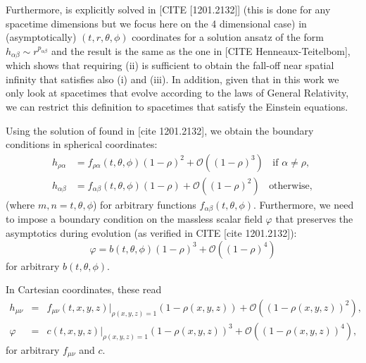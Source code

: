 \documentclass[12pt]{iopart} %
\begin{document}
Furthermore,  is explicitly solved in [CITE [1201.2132]] (this is done for any spacetime dimensions but we focus here on the 4 dimensional case) in (asymptotically) $(t,r,\theta,\phi)$ coordinates for a solution ansatz of the form $h_{\alpha\beta}\sim r^{p_{\alpha\beta}}$ and the result is the same as the one in [CITE Henneaux-Teitelbom], which shows that requiring (ii) is sufficient to obtain the fall-off near spatial infinity that satisfies also (i) and (iii).
In addition, given that in this work we only look at spacetimes that evolve according to the laws of General Relativity, we can restrict this definition to spacetimes that satisfy the Einstein equations.

Using the solution of  found in [cite 1201.2132], we obtain the boundary conditions in spherical coordinates:
\begin{eqnarray}
\label{eq:sphbounconh}
h_{\rho\alpha}&=f_{\rho\alpha}(t,\theta,\phi)(1-\rho)^2+\mathcal{O}((1-\rho)^3) \;\; \textrm{ if $\alpha\neq\rho$}, \\ \nonumber
h_{\alpha\beta}&=f_{\alpha\beta}(t,\theta,\phi)(1-\rho)+\mathcal{O}((1-\rho)^{2}) \;\; \textrm{ otherwise},
\end{eqnarray}
(where $m,n=t,\theta,\phi$) for arbitrary functions $f_{\alpha\beta}(t,\theta,\phi)$. Furthermore, we need to impose a boundary condition on the massless scalar field $\varphi$ that preserves the asymptotics  during evolution (as verified in CITE [cite 1201.2132]):
\begin{equation}\label{eq:sphbounconphi}
\varphi=b(t,\theta,\phi)(1-\rho)^3+\mathcal{O}((1-\rho)^4)
\end{equation}
for arbitrary $b(t,\theta,\phi)$.

In Cartesian coordinates, these read
\begin{eqnarray}
\label{eq:carbouncondh}
h_{\mu\nu}&=&f_{\mu\nu}(t,x,y,z)|_{\rho(x,y,z)=1}(1-\rho(x,y,z))+\mathcal{O}((1-\rho(x,y,z))^{2}), \\
\label{eq:carbouncondphi}
\varphi&=&c(t,x,y,z)|_{\rho(x,y,z)=1}(1-\rho(x,y,z))^3+\mathcal{O}((1-\rho(x,y,z))^{4}), 
\end{eqnarray}
for arbitrary $f_{\mu\nu}$ and $c$.
\end{document}
